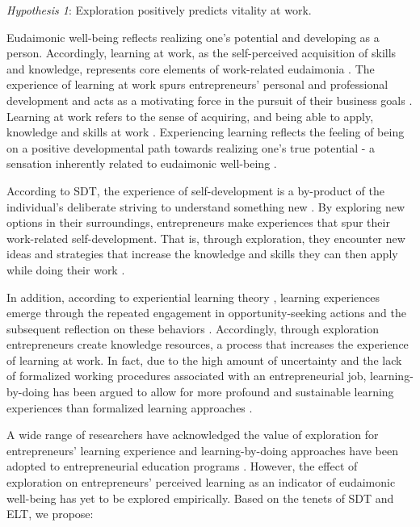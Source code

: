 \documentclass[man]{apa7}
\begin{document}
\textit{Hypothesis 1}: Exploration positively predicts vitality at work. \par 

Eudaimonic well-being reflects realizing one's potential and developing as a person.
Accordingly, learning at work, as the self-perceived acquisition of skills and knowledge, represents core elements of work-related eudaimonia \parencite{Spreitzer.2005b}. 
The experience of learning at work spurs entrepreneurs' personal and professional development and acts as a motivating force in the pursuit of their business goals \parencite{Jayawarna2013}. 
Learning at work refers to the sense of acquiring, and being able to apply, knowledge and skills at work \parencite{Dweck.1986, Spreitzer.2005b}. 
Experiencing learning reflects the feeling of being on a positive developmental path towards realizing one's true potential - a sensation inherently related to eudaimonic well-being \parencite{Spreitzer.2005b}. \par 

According to SDT, the experience of self-development is a by-product of the individual's deliberate striving to understand something new \parencite{Spreitzer.2005b}. 
By exploring new options in their surroundings, entrepreneurs make experiences that spur their work-related self-development. 
That is, through exploration, they encounter new ideas and strategies that increase the knowledge and skills they can then apply while doing their work \parencite{Spreitzer.2005b}. \par  

In addition, according to experiential learning theory \parencite[ELT;][]{Kolb2009}, learning experiences emerge through the repeated engagement in opportunity-seeking actions and the subsequent reflection on these behaviors \parencite{Holcomb2009, Funken2020}. 
Accordingly, through exploration entrepreneurs create knowledge resources, a process that increases the experience of learning at work. 
In fact, due to the high amount of uncertainty and the lack of formalized working procedures associated with an entrepreneurial job, learning-by-doing has been argued to allow for more profound and sustainable learning experiences than formalized learning approaches \parencite[e.g.,][]{Minniti.2001, Cope.2000, Chang2014}. \par 

A wide range of researchers have acknowledged the value of exploration for entrepreneurs' learning experience and learning-by-doing approaches have been adopted to entrepreneurial education programs \parencite[e.g.,][]{Chang2014, Pittaway2011, Daly2001}. 
However, the effect of exploration on entrepreneurs' perceived learning as an indicator of eudaimonic well-being has yet to be explored empirically.   
Based on the tenets of SDT and ELT, we propose: \par 
\end{document}
